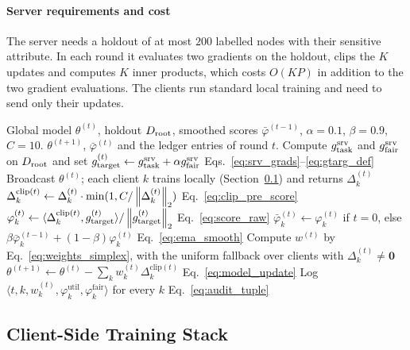\paragraph{Server requirements and cost}
The server needs a holdout of at most $200$ labelled nodes with their sensitive attribute. In each round it evaluates two gradients on the holdout, clips the $K$ updates and computes $K$ inner products, which costs $O(KP)$ in addition to the two gradient evaluations. The clients run standard local training and need to send only their updates.

\begin{algorithm}[t]
\footnotesize
\caption{One round of FU-Alignment}
\label{alg:trustfedgnn}
\begin{algorithmic}[1]
\REQUIRE Global model $\theta^{(t)}$, holdout $D_{\mathrm{root}}$, smoothed scores $\bar{\varphi}^{(t-1)}$, $\alpha = 0.1$, $\beta = 0.9$, $C = 10$.
\ENSURE $\theta^{(t+1)}$, $\bar{\varphi}^{(t)}$ and the ledger entries of round $t$.
\STATE Compute $g_{\mathrm{task}}^{\mathrm{srv}}$ and $g_{\mathrm{fair}}^{\mathrm{srv}}$ on $D_{\mathrm{root}}$ and set $g_{\mathrm{target}}^{(t)} \gets g_{\mathrm{task}}^{\mathrm{srv}} + \alpha g_{\mathrm{fair}}^{\mathrm{srv}}$ \hfill Eqs.~\eqref{eq:srv_grads}--\eqref{eq:gtarg_def}
\STATE Broadcast $\theta^{(t)}$; each client $k$ trains locally (Section~\ref{subsec:client_side}) and returns $\Delta_k^{(t)}$
    \STATE $\Delta_k^{\mathrm{clip}(t)} \gets \Delta_k^{(t)} \cdot \min(1, C / \left\lVert \Delta_k^{(t)} \right\rVert_2)$ \hfill Eq.~\eqref{eq:clip_pre_score}
    \STATE $\varphi_k^{(t)} \gets \langle \Delta_k^{\mathrm{clip}(t)}, g_{\mathrm{target}}^{(t)} \rangle / \left\lVert g_{\mathrm{target}}^{(t)} \right\rVert_2$ \hfill Eq.~\eqref{eq:score_raw}
    \STATE $\bar{\varphi}_k^{(t)} \gets \varphi_k^{(t)}$ if $t = 0$, else $\beta \bar{\varphi}_k^{(t-1)} + (1-\beta) \varphi_k^{(t)}$ \hfill Eq.~\eqref{eq:ema_smooth}
\ENDFOR
\STATE Compute $w^{(t)}$ by Eq.~\eqref{eq:weights_simplex}, with the uniform fallback over clients with $\Delta_k^{(t)} \ne \mathbf{0}$
\STATE $\theta^{(t+1)} \gets \theta^{(t)} - \sum_k w_k^{(t)} \Delta_k^{\mathrm{clip}(t)}$ \hfill Eq.~\eqref{eq:model_update}
\STATE Log $\langle t, k, w_k^{(t)}, \varphi_k^{\mathrm{util}}, \varphi_k^{\mathrm{fair}} \rangle$ for every $k$ \hfill Eq.~\eqref{eq:audit_tuple}
\end{algorithmic}
\end{algorithm}

\subsection{Client-Side Training Stack}
\label{subsec:client_side}

